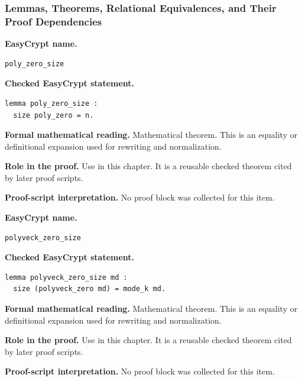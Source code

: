 \subsubsection*{Lemmas, Theorems, Relational Equivalences, and Their Proof Dependencies}
\begin{formaltheorem}
\noindent\textbf{EasyCrypt name.}
\begin{lstlisting}[language=EasyCrypt,basicstyle=\ttfamily\scriptsize]
poly_zero_size
\end{lstlisting}
\noindent\textbf{Checked EasyCrypt statement.}
\begin{lstlisting}[language=EasyCrypt,basicstyle=\ttfamily\scriptsize]
lemma poly_zero_size :
  size poly_zero = n.
\end{lstlisting}
\noindent\textbf{Formal mathematical reading.}
Mathematical theorem. This is an equality or definitional expansion used for rewriting and normalization.

\noindent\textbf{Role in the proof.}
Use in this chapter. It is a reusable checked theorem cited by later proof scripts.

\noindent\textbf{Proof-script interpretation.}
No proof block was collected for this item.

\end{formaltheorem}

\begin{formaltheorem}
\noindent\textbf{EasyCrypt name.}
\begin{lstlisting}[language=EasyCrypt,basicstyle=\ttfamily\scriptsize]
polyveck_zero_size
\end{lstlisting}
\noindent\textbf{Checked EasyCrypt statement.}
\begin{lstlisting}[language=EasyCrypt,basicstyle=\ttfamily\scriptsize]
lemma polyveck_zero_size md :
  size (polyveck_zero md) = mode_k md.
\end{lstlisting}
\noindent\textbf{Formal mathematical reading.}
Mathematical theorem. This is an equality or definitional expansion used for rewriting and normalization.

\noindent\textbf{Role in the proof.}
Use in this chapter. It is a reusable checked theorem cited by later proof scripts.

\noindent\textbf{Proof-script interpretation.}
No proof block was collected for this item.

\end{formaltheorem}

